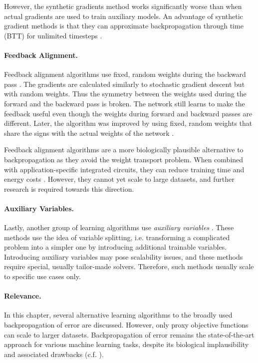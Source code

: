 However, the synthetic gradients method works significantly worse than when actual gradients are used to train auxiliary models.
An advantage of synthetic gradient methods is that they can approximate backpropagation through time (BTT) for unlimited timesteps \cite{jaderberg_decoupled_2017}.

\paragraph{Feedback Alignment.} Feedback alignment algorithms use fixed, random weights during the backward pass .
The gradients are calculated similarly to stochastic gradient descent but with random weights.
Thus the symmetry between the weights used during the forward and the backward pass is broken.
The network still learns to make the feedback useful even though the weights during forward and backward passes are different. 
Later, the algorithm was improved by using fixed, random weights that share the signs with the actual weights of the network .

Feedback alignment algorithms are a more biologically plausible alternative to backpropagation as they avoid the weight transport problem.
When combined with application-specific integrated circuits, they can reduce training time and energy costs \cite{lillicrap_random_2016}.
However, they cannot yet scale to large datasets, and further research is required towards this direction.

\paragraph{Auxiliary Variables.} Lastly, another group of learning algorithms use \emph{auxiliary variables} .
These methods use the idea of variable splitting, i.e. transforming a complicated problem into a simpler one by introducing additional trainable variables.
Introducing auxiliary variables may pose scalability issues, and these methods require special, usually tailor-made solvers.
Therefore, such methods usually scale to specific use cases only.

\paragraph{Relevance.} In this chapter, several alternative learning algorithms to the broadly used backpropagation of error  are discussed. However, only proxy objective functions can scale to larger datasets. Backpropagation of error remains the state-of-the-art approach for various machine learning tasks, despite its biological implausibility  and associated drawbacks \cite{zhang_why_2020, ioffe_batch_2015, akhtar_threat_2018, long_survey_2022, madan_when_2022} (c.f. ).


